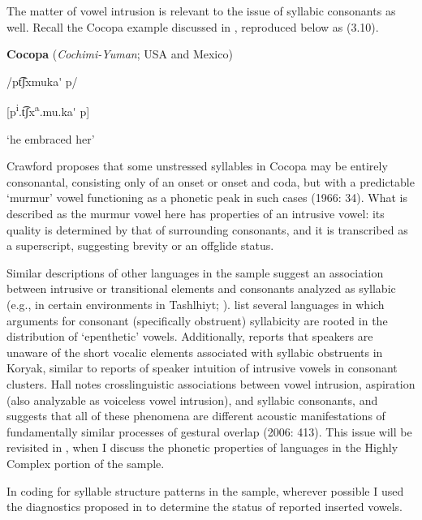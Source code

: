   The matter of vowel intrusion is relevant to the issue of syllabic consonants as well. Recall the Cocopa example discussed in , reproduced below as (3.10).



\ea\label{ex:(3.10)}
  \textbf{Cocopa} (\textit{Cochimi-Yuman}; USA and Mexico)



/pt͡ʃxmuka\'{} p/



[p\textsuperscript{i}.t͡ʃx\textsuperscript{a}.mu.ka\'{} p]



‘he embraced her’



\citep[43]{Crawford1966}
\z



Crawford proposes that some unstressed syllables in Cocopa may be entirely consonantal, consisting only of an onset or onset and coda, but with a predictable ‘murmur’ vowel functioning as a phonetic peak in such cases (1966: 34). What is described as the murmur vowel here has properties of an intrusive vowel: its quality is determined by that of surrounding consonants, and it is transcribed as a superscript, suggesting brevity or an offglide status.



  Similar descriptions of other languages in the sample suggest an association between intrusive or transitional elements and consonants analyzed as syllabic (e.g., in certain environments in Tashlhiyt; \citealt{DellElmedlaoui2002}). \citet{HargusBeavert2006} list several languages in which arguments for consonant (specifically obstruent) syllabicity are rooted in the distribution of ‘epenthetic’ vowels. Additionally, \citet[185-6]{Bell1978a} reports that speakers are unaware of the short vocalic elements associated with syllabic obstruents in Koryak, similar to reports of speaker intuition of intrusive vowels in consonant clusters. Hall notes crosslinguistic associations between vowel intrusion, aspiration (also analyzable as voiceless vowel intrusion), and syllabic consonants, and suggests that all of these phenomena are different acoustic manifestations of fundamentally similar processes of gestural overlap (2006: 413). This issue will be revisited in , when I discuss the phonetic properties of languages in the Highly Complex portion of the sample.



  In coding for syllable structure patterns in the sample, wherever possible I used the diagnostics proposed in \citet{Hall2006} to determine the status of reported inserted vowels.


